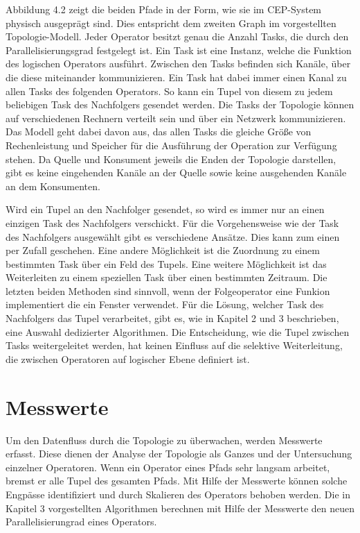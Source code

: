 Abbildung 4.2 zeigt die beiden Pfade in der Form, wie sie im CEP-System physisch ausgeprägt sind.
Dies entspricht dem zweiten Graph im vorgestellten Topologie-Modell.
Jeder Operator besitzt genau die Anzahl Tasks, die durch den Parallelisierungsgrad festgelegt ist.
Ein Task ist eine Instanz, welche die Funktion des logischen Operators ausführt.
Zwischen den Tasks befinden sich Kanäle, über die diese miteinander kommunizieren.
Ein Task hat dabei immer einen Kanal zu allen Tasks des folgenden Operators.
So kann ein Tupel von diesem zu jedem beliebigen Task des Nachfolgers gesendet werden.
Die Tasks der Topologie können auf verschiedenen Rechnern verteilt sein und über ein Netzwerk kommunizieren.
Das Modell geht dabei davon aus, das allen Tasks die gleiche Größe von Rechenleistung und Speicher für die Ausführung der Operation zur Verfügung stehen.
Da Quelle und Konsument jeweils die Enden der Topologie darstellen, gibt es keine eingehenden Kanäle an der Quelle sowie keine ausgehenden Kanäle an dem Konsumenten.

Wird ein Tupel an den Nachfolger gesendet, so wird es immer nur an einen einzigen Task des Nachfolgers verschickt.
Für die Vorgehensweise wie der Task des Nachfolgers ausgewählt gibt es verschiedene Ansätze.
Dies kann zum einen per Zufall geschehen.
Eine andere Möglichkeit ist die Zuordnung zu einem bestimmten Task über ein Feld des Tupels.
Eine weitere Möglichkeit ist das Weiterleiten zu einem speziellen Task über einen bestimmten Zeitraum.
Die letzten beiden Methoden sind sinnvoll, wenn der Folgeoperator eine Funkion implementiert die ein Fenster verwendet.
Für die Lösung, welcher Task des Nachfolgers das Tupel verarbeitet, gibt es, wie in Kapitel 2 und 3 beschrieben, eine Auswahl dedizierter Algorithmen.
Die Entscheidung, wie die Tupel zwischen Tasks weitergeleitet werden, hat keinen Einfluss auf die selektive Weiterleitung, die zwischen Operatoren auf logischer Ebene definiert ist.

\section{Messwerte}

Um den Datenfluss durch die Topologie zu überwachen, werden Messwerte erfasst.
Diese dienen der Analyse der Topologie als Ganzes und der Untersuchung einzelner Operatoren.
Wenn ein Operator eines Pfads sehr langsam arbeitet, bremst er alle Tupel des gesamten Pfads.
Mit Hilfe der Messwerte können solche Engpässe identifiziert und durch Skalieren des Operators behoben werden.
Die in Kapitel 3 vorgestellten Algorithmen berechnen mit Hilfe der Messwerte den neuen Parallelisierungrad eines Operators.

